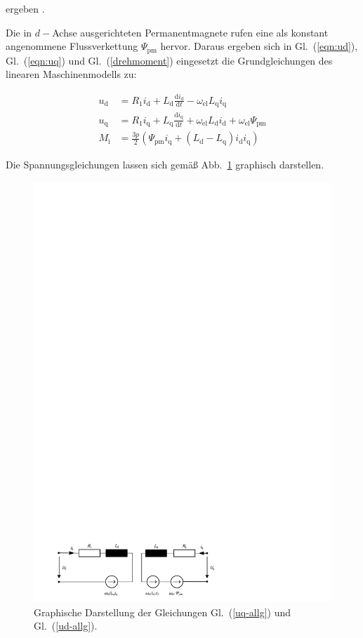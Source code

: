 \documentclass[conference,twocolumn]{IEEEtran}
\newcommand{\x}[1]{\mathrm{#1}}
\begin{document}
ergeben \autocite{schroder2001}.

Die in $d-$Achse ausgerichteten Permanentmagnete rufen eine als konstant angenommene Flussverkettung $\Psi_\x{pm}$ hervor.
Daraus ergeben sich in Gl.~(\ref{eqn:ud}), Gl.~(\ref{eqn:uq}) und Gl.~(\ref{drehmoment}) eingesetzt die Grundgleichungen des linearen Maschinenmodells zu:

\begin{align}
u_\x{d} &= R_\x{1} i_\x{d} + L_\x{d} \frac{\x{d}i_\x{d}}{\x{d}t} - \omega_\x{el}L_\x{q} i_\x{q}  \label{uq-allg} \\ 
u_\x{q} &= R_\x{1} i_\x{q} + L_\x{q} \frac{\x{d}i_\x{q}}{\x{d}t} + \omega_\x{el}L_\x{d} i_\x{d} + \omega_\x{el}\Psi_\x{pm} \label{ud-allg} \\ 
M_\x{i} &= \frac{3p}{2}(\Psi_\x{pm} i_\x{q} + (L_\x{d} - L_\x{q})i_\x{d} i_\x{q})
\end{align}

Die Spannungsgleichungen lassen sich gemäß Abb.~\ref{fig:spannungsgleichungen} graphisch darstellen.

\begin{figure}[!h]
\centering
\includegraphics[width=\columnwidth]{img/spannungsgleichungen}
\caption{Graphische Darstellung der Gleichungen Gl.~(\ref{uq-allg}) und Gl.~(\ref{ud-allg}).}
\label{fig:spannungsgleichungen}
\end{figure}
\end{document}
